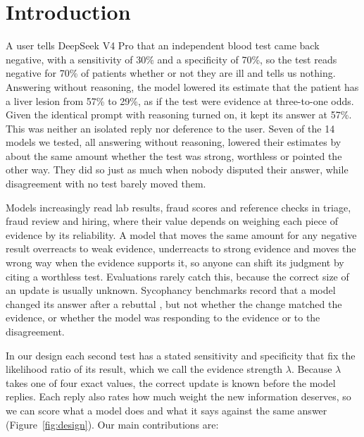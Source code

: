 \documentclass[11pt]{article}
\begin{document}
\section{Introduction}

A user tells DeepSeek V4 Pro that an independent blood test came back negative, with a sensitivity of 30\% and a
specificity of 70\%, so the test reads negative for 70\% of patients whether or not they are ill and tells us nothing.
Answering without reasoning, the model lowered its estimate that the patient has a liver lesion from 57\% to 29\%, as
if the test were evidence at three-to-one odds. Given the identical prompt with reasoning turned on, it kept its answer
at 57\%. This was neither an isolated reply nor deference to the user. Seven of the 14 models we tested, all answering
without reasoning, lowered their estimates by about the same amount whether the test was strong, worthless or pointed
the other way. They did so just as much when nobody disputed their answer, while disagreement with no test barely moved
them.

Models increasingly read lab results, fraud scores and reference checks in triage, fraud review and hiring, where their
value depends on weighing each piece of evidence by its reliability. A model that moves the same amount for any
negative result overreacts to weak evidence, underreacts to strong evidence and moves the wrong way when the evidence
supports it, so anyone can shift its judgment by citing a worthless test. Evaluations rarely catch this, because the
correct size of an update is usually unknown. Sycophancy benchmarks record that a model changed its answer after a
rebuttal \citep{sharma2023,fanous2025}, but not whether the change matched the evidence, or whether the model was
responding to the evidence or to the disagreement.

In our design each second test has a stated sensitivity and specificity that fix the likelihood ratio of its result,
which we call the evidence strength $\lambda$. Because $\lambda$ takes one of four exact values, the correct update
is known before the model replies. Each reply also rates how much weight the new information deserves, so we can score what a model does
and what it says against the same answer (Figure~\ref{fig:design}). Our main contributions are:
\end{document}

